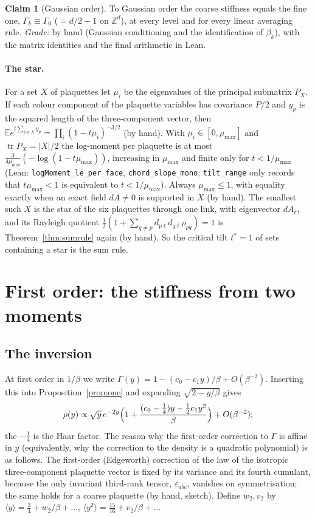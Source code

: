 \documentclass[11pt,a4paper]{article}
\theoremstyle{definition}
\newtheorem{claim}[theorem]{Claim}
\theoremstyle{remark}
\newcommand{\E}{\mathbb{E}}
\newcommand{\code}[1]{\texttt{#1}}
\begin{document}
\begin{claim}[Gaussian order]\label{claim:gauss}
To Gaussian order the coarse stiffness equals the fine one, $\Gamma_k\equiv\Gamma_0$ ($=d/2-1$ on $\mathbb Z^d$), at every level and for every linear averaging rule. \emph{Grade:} by hand (Gaussian conditioning and the identification of $\beta_k$), with the matrix identities and the final arithmetic in Lean.
\end{claim}

\paragraph{The star.} For a set $X$ of plaquettes let $\mu_i$ be the eigenvalues of the principal submatrix $P_X$. If each colour component of the plaquette variables has covariance $P/2$ and $y_p$ is the squared length of the three-component vector, then $\E e^{t\sum_{p\in X}y_p}=\prod_i(1-t\mu_i)^{-3/2}$ (by hand). With $\mu_i\in[0,\mu_{\max}]$ and $\operatorname{tr}P_X=|X|/2$ the log-moment per plaquette is at most $\frac{3}{4\mu_{\max}}(-\log(1-t\mu_{\max}))$, increasing in $\mu_{\max}$ and finite only for $t<1/\mu_{\max}$ (Lean: \code{logMoment\_le\_per\_face}, \code{chord\_slope\_mono}; \code{tilt\_range} only records that $t\mu_{\max}<1$ is equivalent to $t<1/\mu_{\max}$). Always $\mu_{\max}\le1$, with equality exactly when an exact field $dA\ne0$ is supported in $X$ (by hand). The smallest such $X$ is the star of the six plaquettes through one link, with eigenvector $dA_\ell$, and its Rayleigh quotient $\tfrac12(1+\sum_{q\ne p}d_{p\ell}d_{q\ell}\rho_{pq})=1$ is Theorem~\ref{thm:sumrule} again (by hand). So the critical tilt $t^*=1$ of sets containing a star is the sum rule.

\section{First order: the stiffness from two moments}\label{sec:first}

\subsection{The inversion}

At first order in $1/\beta$ we write $\Gamma(y)=1-(c_0-c_1y)/\beta+O(\beta^{-2})$. Inserting this into Proposition~\ref{prop:one} and expanding $\sqrt{2-y/\beta}$ gives
\[
\rho(y)\propto\sqrt y\,e^{-2y}\Bigl(1+\frac{(c_0-\frac14)y-\frac12c_1y^2}{\beta}\Bigr)+O(\beta^{-2});
\]
the $-\tfrac14$ is the Haar factor. The reason why the first-order correction to $\Gamma$ is affine in $y$ (equivalently, why the correction to the density is a quadratic polynomial) is as follows. The first-order (Edgeworth) correction of the law of the isotropic three-component plaquette vector is fixed by its variance and its fourth cumulant, because the only invariant third-rank tensor, $\varepsilon_{abc}$, vanishes on symmetrisation; the same holds for a coarse plaquette (by hand, sketch). Define $w_2,v_2$ by $\langle y\rangle=\tfrac34+w_2/\beta+\dots$, $\langle y^2\rangle=\tfrac{15}{16}+v_2/\beta+\dots$
\end{document}
